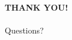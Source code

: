 \documentclass[xcolor=dvipsnames]{beamer}
\begin{document}




\begin{frame}{\ }
\begin{center}
{\bf \Large THANK YOU!} \\ \ \\  
Questions?
\end{center}
\end{frame}



% 
\end{document}
